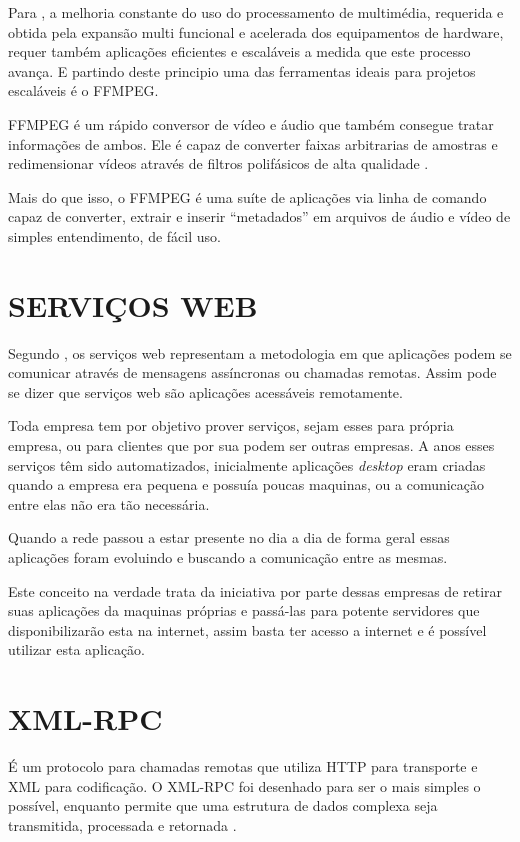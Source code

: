 Para \cite{FFMPEG-SCALABLE}, a melhoria constante do uso do processamento de multimédia, requerida e obtida pela expansão multi funcional e acelerada dos equipamentos de hardware, requer também aplicações eficientes e escaláveis a medida que este processo avança. E partindo deste principio uma das ferramentas ideais para projetos escaláveis é o FFMPEG.

FFMPEG é um rápido conversor de vídeo e áudio que também consegue tratar informações de ambos. Ele é capaz de converter faixas arbitrarias de amostras e redimensionar vídeos através de filtros polifásicos de alta qualidade \cite{FFMPEG}.

Mais do que isso, o FFMPEG é uma suíte de aplicações via linha de comando capaz de converter, extrair e inserir ``metadados'' em arquivos de áudio e vídeo de simples entendimento, de fácil uso.


\section{SERVIÇOS WEB}

Segundo \cite{PIRNAU}, os serviços web representam a metodologia em que aplicações podem se comunicar através de mensagens assíncronas ou chamadas remotas. Assim pode se dizer que serviços web são aplicações acessáveis remotamente.

Toda empresa tem por objetivo prover serviços, sejam esses para própria empresa, ou para clientes que por sua podem ser outras empresas. A anos esses serviços têm sido automatizados, inicialmente aplicações \textit{desktop} eram criadas quando a empresa era pequena e possuía poucas maquinas, ou a comunicação entre elas não era tão necessária.

Quando a rede passou a estar presente no dia a dia de forma geral essas aplicações foram evoluindo e buscando a comunicação entre as mesmas.

Este conceito na verdade trata da iniciativa por parte dessas empresas de retirar suas aplicações da maquinas próprias e passá-las para potente servidores que disponibilizarão esta na internet, assim basta ter acesso a internet e é possível utilizar esta aplicação.


\section{XML-RPC}

É um protocolo para chamadas remotas que utiliza HTTP para transporte e XML para codificação. O XML-RPC foi desenhado para ser o mais simples o possível, enquanto permite que uma estrutura de dados complexa seja transmitida, processada e retornada \cite{XMLRPC}.

